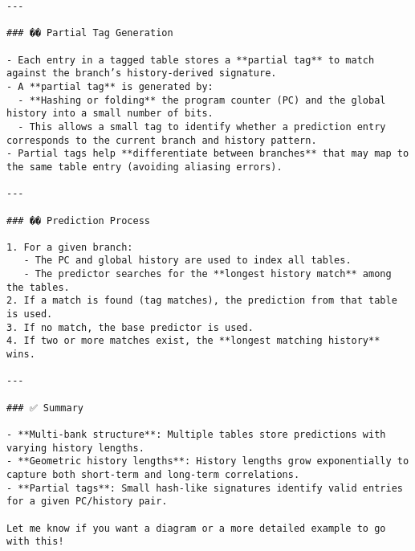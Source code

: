 \documentclass[11pt]{article}
\begin{document}
\begin{Verbatim}[fontsize=\tiny, breaklines=true]
---

### �� Partial Tag Generation

- Each entry in a tagged table stores a **partial tag** to match against the branch’s history-derived signature.
- A **partial tag** is generated by:
  - **Hashing or folding** the program counter (PC) and the global history into a small number of bits.
  - This allows a small tag to identify whether a prediction entry corresponds to the current branch and history pattern.
- Partial tags help **differentiate between branches** that may map to the same table entry (avoiding aliasing errors).

---

### �� Prediction Process

1. For a given branch:
   - The PC and global history are used to index all tables.
   - The predictor searches for the **longest history match** among the tables.
2. If a match is found (tag matches), the prediction from that table is used.
3. If no match, the base predictor is used.
4. If two or more matches exist, the **longest matching history** wins.

---

### ✅ Summary

- **Multi-bank structure**: Multiple tables store predictions with varying history lengths.
- **Geometric history lengths**: History lengths grow exponentially to capture both short-term and long-term correlations.
- **Partial tags**: Small hash-like signatures identify valid entries for a given PC/history pair.

Let me know if you want a diagram or a more detailed example to go with this!
\end{Verbatim}
\end{document}

